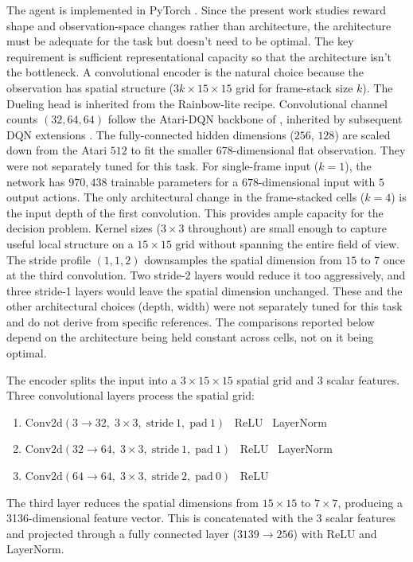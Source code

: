 \documentclass[12pt,a4paper,titlepage]{article}
\begin{document}
The agent is implemented in PyTorch \citep{Paszke2019}. Since the present work studies reward shape and observation-space changes rather than architecture, the architecture must be adequate for the task but doesn't need to be optimal. The key requirement is sufficient representational capacity so that the architecture isn't the bottleneck. A convolutional encoder is the natural choice because the observation has spatial structure ($3k \times 15 \times 15$ grid for frame-stack size $k$). The Dueling head is inherited from the Rainbow-lite recipe. Convolutional channel counts $(32, 64, 64)$ follow the Atari-DQN backbone of \citet{Mnih2015}, inherited by subsequent DQN extensions \citep{Wang2016, Hessel2018}. The fully-connected hidden dimensions ($256$, $128$) are scaled down from the Atari $512$ to fit the smaller $678$-dimensional flat observation. They were not separately tuned for this task. For single-frame input ($k=1$), the network has $970{,}438$ trainable parameters for a $678$-dimensional input with $5$ output actions. The only architectural change in the frame-stacked cells ($k=4$) is the input depth of the first convolution. This provides ample capacity for the decision problem. Kernel sizes ($3 \times 3$ throughout) are small enough to capture useful local structure on a $15 \times 15$ grid without spanning the entire field of view. The stride profile $(1, 1, 2)$ downsamples the spatial dimension from $15$ to $7$ once at the third convolution. Two stride-2 layers would reduce it too aggressively, and three stride-1 layers would leave the spatial dimension unchanged. These and the other architectural choices (depth, width) were not separately tuned for this task and do not derive from specific references. The comparisons reported below depend on the architecture being held constant across cells, not on it being optimal.

The encoder splits the input into a $3 \times 15 \times 15$ spatial grid and 3 scalar features. Three convolutional layers process the spatial grid:
\begin{enumerate}[nosep]
\item $\text{Conv2d}(3 \to 32,\; 3 \times 3,\; \text{stride}\ 1,\; \text{pad}\ 1)$ \textrightarrow\ ReLU \textrightarrow\ LayerNorm
\item $\text{Conv2d}(32 \to 64,\; 3 \times 3,\; \text{stride}\ 1,\; \text{pad}\ 1)$ \textrightarrow\ ReLU \textrightarrow\ LayerNorm
\item $\text{Conv2d}(64 \to 64,\; 3 \times 3,\; \text{stride}\ 2,\; \text{pad}\ 0)$ \textrightarrow\ ReLU
\end{enumerate}
The third layer reduces the spatial dimensions from $15 \times 15$ to $7 \times 7$, producing a 3136-dimensional feature vector. This is concatenated with the 3 scalar features and projected through a fully connected layer ($3139 \to 256$) with ReLU and LayerNorm.
\end{document}
